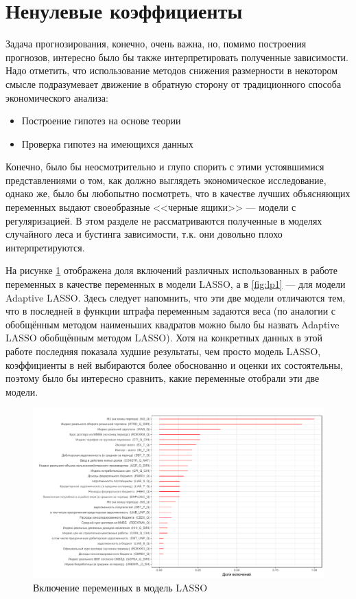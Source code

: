 \section{Ненулевые коэффициенты}
Задача прогнозирования, конечно, очень важна, но, помимо построения прогнозов, интересно было бы также интерпретировать полученные зависимости. Надо отметить, что использование методов снижения размерности в некотором смысле подразумевает движение в обратную сторону от традиционного способа экономического анализа:


\begin{itemize}
    \item Построение гипотез на основе теории
\item Проверка гипотез на имеющихся данных
\end{itemize}
Конечно, было бы неосмотрительно и глупо спорить с этими устоявшимися представлениями о том, как должно выглядеть экономическое исследование, однако же, было бы любопытно посмотреть, что в качестве лучших объясняющих переменных выдают своеобразные <<черные ящики>> --- модели с регуляризацией. В этом разделе не рассматриваются полученные в моделях случайного леса и бустинга зависимости, т.к. они довольно плохо интерпретируются.

На рисунке \ref{fig:lp2} отображена доля включений различных использованных в работе переменных в качестве переменных в модели LASSO, а в \ref{fig:lp1} --- для модели Adaptive LASSO. Здесь следует напомнить, что эти две модели отличаются тем, что в последней в функции штрафа переменным задаются веса (по аналогии с обобщённым методом наименьших квадратов можно было бы назвать Adaptive LASSO обобщённым методом LASSO). Хотя на конкретных данных в этой работе последняя показала худшие результаты, чем просто модель LASSO, коэффициенты в ней выбираются более обоснованно и оценки их состоятельны, поэтому было бы интересно сравнить, какие переменные отобрали эти две модели.
\begin{figure}[h]
    \centering
    \includegraphics[width = \textwidth]{nzlollipop2.pdf}
    \caption{Включение переменных в модель LASSO}
    \label{fig:lp2}
\end{figure}

